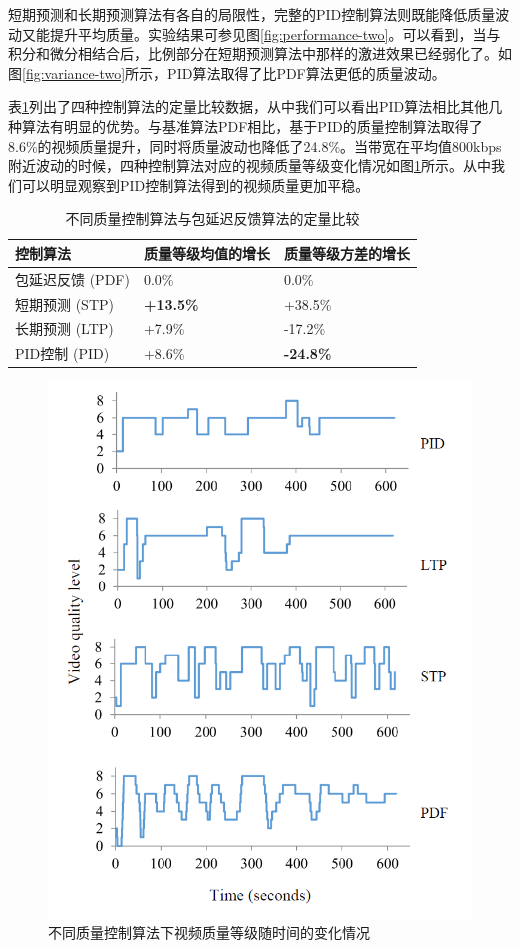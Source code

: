 短期预测和长期预测算法有各自的局限性，完整的PID控制算法则既能降低质量波动又能提升平均质量。实验结果可参见图\ref{fig:performance-two}。可以看到，当与积分和微分相结合后，比例部分在短期预测算法中那样的激进效果已经弱化了。如图\ref{fig:variance-two}所示，PID算法取得了比PDF算法更低的质量波动。

表\ref{tab:improvement}列出了四种控制算法的定量比较数据，从中我们可以看出PID算法相比其他几种算法有明显的优势。与基准算法PDF相比，基于PID的质量控制算法取得了8.6\%的视频质量提升，同时将质量波动也降低了24.8\%。当带宽在平均值800kbps附近波动的时候，四种控制算法对应的视频质量等级变化情况如图\ref{fig:fluctuation}所示。从中我们可以明显观察到PID控制算法得到的视频质量更加平稳。

\begin{table}[!h]
	\centering
	\vspace{10pt}
	\caption{不同质量控制算法与包延迟反馈算法的定量比较}
	\label{tab:improvement}
	\begin{tabular}[b]{p{4.2cm}<{\centering}|p{4.2cm}<{\centering}|p{4.2cm}<{\centering}}
		\hline \hline
		控制算法 & 质量等级均值的增长 & 质量等级方差的增长 \\ \hline
		包延迟反馈 (PDF) & 0.0\% & 0.0\% \\ \hline
		短期预测 (STP) & \textbf{+13.5\%} & +38.5\% \\ \hline
		长期预测 (LTP) & +7.9\% & -17.2\% \\ \hline
		PID控制 (PID) & +8.6\% & \textbf{-24.8\%} \\ \hline
	\end{tabular}
	\vspace{10pt}
\end{table}

\begin{figure}[!h]
	\centering
	\vspace{10pt}
	\includegraphics[width = 0.8\linewidth]{figures/fluctuation.png}
	\caption{不同质量控制算法下视频质量等级随时间的变化情况 \label{fig:fluctuation}}
\end{figure}

